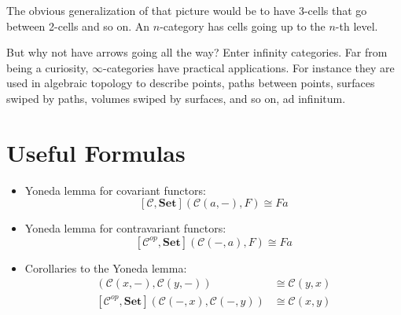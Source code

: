 \documentclass[DaoFP]{subfiles}
\begin{document}
The obvious generalization of that picture would be to have 3-cells that go between 2-cells and so on. An $n$-category has cells going up to the $n$-th level. 

But why not have arrows going all the way? Enter infinity categories. Far from being a curiosity, $\infty$-categories have practical applications. For instance they are used in algebraic topology to describe points, paths between points, surfaces swiped by paths, volumes swiped by surfaces, and so on, ad infinitum. 

\section{Useful Formulas}
\begin{itemize}
\item Yoneda lemma for covariant functors:
\[ [\mathcal{C}, \mathbf{Set}]( \mathcal{C}(a, -), F) \cong F a \]
\item Yoneda lemma for contravariant functors:
\[ [\mathcal{C}^{op}, \mathbf{Set}]( \mathcal{C}(-, a), F) \cong F a \]
\item Corollaries to the Yoneda lemma:
\begin{align*}
 [\mathcal{C}, \mathbf{Set}]( \mathcal{C}(x, -), \mathcal{C}(y, -)) &\cong \mathcal{C}(y, x) \\
 [\mathcal{C}^{op}, \mathbf{Set}]( \mathcal{C}(-, x), \mathcal{C}(-, y)) &\cong \mathcal{C}(x, y)
\end{align*}

\end{itemize}
\end{document}
